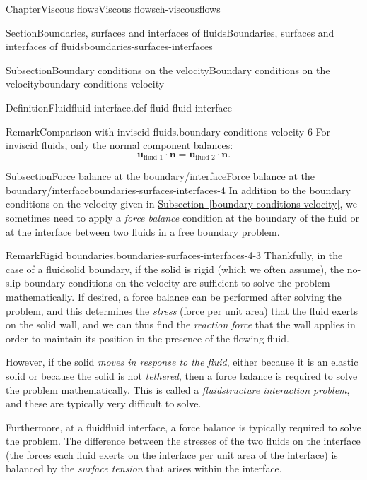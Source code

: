 \documentclass[oneside,10pt,]{book}
\newcommand{\xreffont}{\relax}
\numberwithin{equation}{section}
\newcommand{\bn}{\boldsymbol{n}}
\newcommand{\bu}{\boldsymbol{u}}
\begin{document}
\begin{chapterptx}{Chapter}{Viscous flows}{}{Viscous flows}{}{}{ch-viscousflows}
\begin{sectionptx}{Section}{Boundaries, surfaces and interfaces of fluids}{}{Boundaries, surfaces and interfaces of fluids}{}{}{boundaries-surfaces-interfaces}
\begin{subsectionptx}{Subsection}{Boundary conditions on the velocity}{}{Boundary conditions on the velocity}{}{}{boundary-conditions-velocity}
\begin{definition}{Definition}{Fluid\textendash{}fluid interface.}{}{def-fluid-fluid-interface}
%
\end{definition}
\begin{remark}{Remark}{Comparison with inviscid fluids.}{boundary-conditions-velocity-6}%
For inviscid fluids, only the normal component balances:%
\begin{equation*}
\bu_{\textrm{fluid 1}}\cdot\bn=
\bu_{\textrm{fluid 2}}\cdot\bn.
\end{equation*}
%
\end{remark}
\end{subsectionptx}
%
%
\typeout{************************************************}
\typeout{************************************************}
%
\begin{subsectionptx}{Subsection}{Force balance at the boundary\slash{}interface}{}{Force balance at the boundary\slash{}interface}{}{}{boundaries-surfaces-interfaces-4}
In addition to the boundary conditions on the velocity given in \hyperref[boundary-conditions-velocity]{Subsection~{\xreffont\ref{boundary-conditions-velocity}}}, we sometimes need to apply a \emph{force balance} condition at the boundary of the fluid or at the interface between two fluids in a free boundary problem.%
\begin{remark}{Remark}{Rigid boundaries.}{boundaries-surfaces-interfaces-4-3}%
Thankfully, in the case of a fluid\textendash{}solid boundary, if the solid is rigid (which we often assume), the no-slip boundary conditions on the velocity are sufficient to solve the problem mathematically. If desired, a force balance can be performed after solving the problem, and this determines the \emph{stress} (force per unit area) that the fluid exerts on the solid wall, and we can thus find the \emph{reaction force} that the wall applies in order to maintain its position in the presence of the flowing fluid.%
\end{remark}
However, if the solid \emph{moves in response to the fluid}, either because it is an elastic solid or because the solid is not \emph{tethered}, then a force balance is required to solve the problem mathematically. This is called a \emph{fluid\textendash{}structure interaction problem}, and these are typically very difficult to solve.%
\par
Furthermore, at a fluid\textendash{}fluid interface, a force balance is typically required to solve the problem. The difference between the stresses of the two fluids on the interface (the forces each fluid exerts on the interface per unit area of the interface) is balanced by the \emph{surface tension} that arises within the interface.%

\end{subsectionptx}
\end{sectionptx}
\end{chapterptx}
\end{document}
